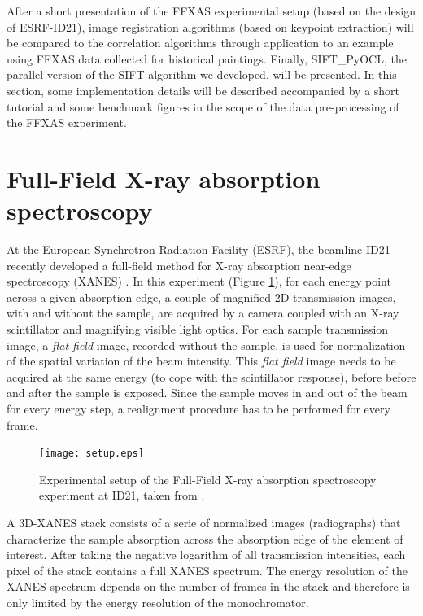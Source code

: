 \documentclass[preprint]{iucr}
\begin{document}
After a short presentation of the FFXAS
experimental setup (based on the design of ESRF-ID21), image registration
algorithms (based on keypoint extraction) will
be compared to the correlation algorithms through application to an example
using FFXAS data collected for historical paintings.
Finally, SIFT\_PyOCL, the parallel version of the SIFT algorithm we developed,
will be presented. In this section, some implementation details will be
described accompanied by a short tutorial and some benchmark
figures in the scope of the data pre-processing of the FFXAS experiment.

\section{Full-Field X-ray absorption spectroscopy}
At the European Synchrotron Radiation Facility (ESRF), the beamline ID21
recently developed a full-field method for X-ray absorption near-edge
spectroscopy (XANES) \cite{andrade,fullfield}.
In this experiment (Figure \ref{setup}), for each energy point across a given
absorption edge, a couple of magnified 2D transmission images, with and
without the sample, are acquired by a camera coupled with an
X-ray scintillator and magnifying visible light optics.
For each sample transmission image, a \emph{flat field} image,
recorded without the sample, is used for normalization of the spatial
variation of the beam intensity.
This \emph{flat field} image needs to be acquired at the same energy (to cope
with the scintillator response), before before and after the sample is exposed.
Since the sample moves in and out of the beam for every energy step, a
realignment procedure has to be performed for every frame.

\begin{figure}
\label{setup}
\begin{center}
\texttt{[image: setup.eps]}
\caption{Experimental setup of the Full-Field X-ray absorption
spectroscopy experiment at ID21, taken from \cite{fullfield}.}
\end{center}
\end{figure}

A 3D-XANES stack consists of a serie of normalized images (radiographs) that
characterize the sample absorption across the absorption edge of the
element of interest.
After taking the negative logarithm of all transmission intensities, each
pixel of the stack contains a full XANES spectrum. 
The energy resolution of the XANES spectrum depends on the number of frames in
the stack and therefore is only limited by the energy resolution of the monochromator.
\end{document}
